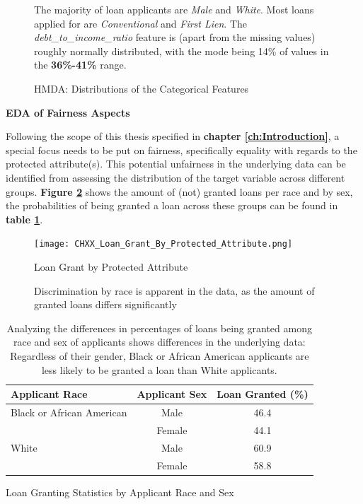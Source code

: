 \begin{figure}[h]
    \caption{HMDA: Distributions of the Categorical Features}
    \label{fig:HMDA_Categorical_Features_Distributions}
    \medskip
    \small
    The majority of loan applicants are \textit{Male} and \textit{White}. Most loans applied for are \textit{Conventional} and \textit{First Lien}. The \textit{debt\_to\_income\_ratio} feature is (apart from the missing values) roughly normally distributed, with the mode being 14\% of values in the \textbf{36\%-41\%} range.

\end{figure}


\textbf{EDA of Fairness Aspects}

Following the scope of this thesis specified in \textbf{chapter \ref{ch:Introduction}}, a special focus needs to be put  on fairness, specifically equality with regards to the protected attribute(s).
This potential unfairness in the underlying data can be identified from assessing the distribution of the target variable across different groups.
\textbf{Figure \ref{fig:CHXX_Loan_Grant_By_Protected_Attribute}} shows the amount of (not) granted loans per race and by sex, the probabilities of being granted a loan across these groups can be found in \textbf{table \ref{tab:loan_granting}}.\@

\begin{figure}[h]
    \centering
    \texttt{[image: CHXX\_Loan\_Grant\_By\_Protected\_Attribute.png]}
    \caption{Loan Grant by Protected Attribute}
    \caption*{Discrimination by race is apparent in the data, as the amount of granted loans differs significantly}
    \label{fig:CHXX_Loan_Grant_By_Protected_Attribute}
\end{figure}

\begin{table}[htbp]
    \centering
      \begin{tabular}{lcc}
      \toprule
      \textbf{Applicant Race} & \textbf{Applicant Sex} & \textbf{Loan Granted (\%)} \\
      \midrule
      Black or African American & Male    & 46.4 \\
            & Female  & 44.1 \\
      White & Male    & 60.9 \\
            & Female  & 58.8 \\
      \bottomrule
      \end{tabular}
      \caption{Loan Granting Statistics by Applicant Race and Sex}
      \caption*{Analyzing the differences in percentages of loans being granted among race and sex of applicants shows differences in the underlying data: Regardless of their gender, Black or African American applicants are less likely to be granted a loan than White applicants.}
    \label{tab:loan_granting}%
\end{table}%

